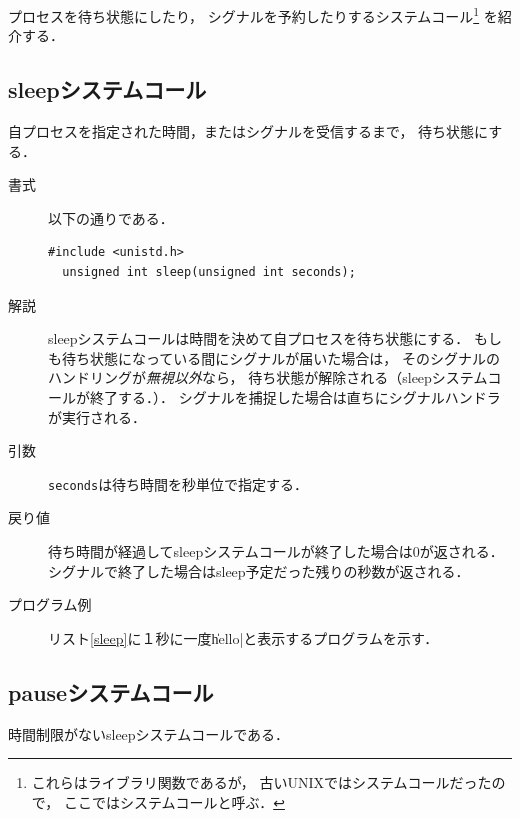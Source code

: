 プロセスを待ち状態にしたり，
シグナルを予約したりするシステムコール\footnote{
これらはライブラリ関数であるが，
古いUNIXではシステムコールだったので，
ここではシステムコールと呼ぶ．}
を紹介する．

\subsection{sleepシステムコール}
自プロセスを指定された時間，またはシグナルを受信するまで，
待ち状態にする．

\begin{description}
\item[書式] 以下の通りである．

\begin{lstlisting}[numbers=none]
  #include <unistd.h>
  unsigned int sleep(unsigned int seconds);
\end{lstlisting}

\item[解説]
  sleepシステムコールは時間を決めて自プロセスを待ち状態にする．
  もしも待ち状態になっている間にシグナルが届いた場合は，
  そのシグナルのハンドリングが\emph{無視以外}なら，
  待ち状態が解除される（sleepシステムコールが終了する．）．
  シグナルを捕捉した場合は直ちにシグナルハンドラが実行される．

\item[引数]
  \texttt{seconds}は待ち時間を秒単位で指定する．

\item[戻り値]
  待ち時間が経過してsleepシステムコールが終了した場合は0が返される．
  シグナルで終了した場合はsleep予定だった残りの秒数が返される．
  
\item[プログラム例]
  リスト\ref{sleep}に１秒に一度\|hello|と表示するプログラムを示す．

  

\end{description}

\subsection{pauseシステムコール}
時間制限がないsleepシステムコールである．

